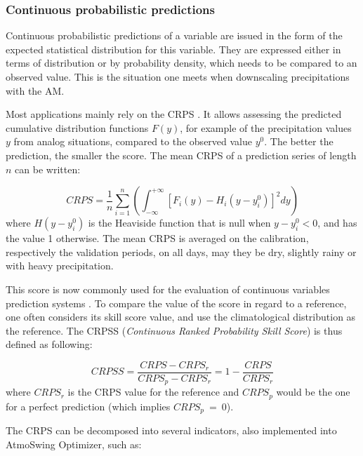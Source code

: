 \documentclass[review]{elsarticle}
\begin{document}
\subsubsection{Continuous probabilistic predictions}
\label{sec:prob_forecasts}

Continuous probabilistic predictions of a variable are issued in the form of the expected statistical distribution for this variable. They are expressed either in terms of distribution or by probability density, which needs to be compared to an observed value. This is the situation one meets when downscaling precipitations with the AM.

Most applications mainly rely on the CRPS \citep[Continuous Ranked Probability Score,][]{Brown1974, Matheson1976, Hersbach2000}. It allows assessing the predicted cumulative distribution functions $F(y)$, for example of the precipitation values $y$ from analog situations, compared to the observed value $y^{0}$. The better the prediction, the smaller the score. The mean CRPS of a prediction series of length $n$ can be written:

\begin{equation}
\label{eq:CRPS}
CRPS = \frac{1}{n} \sum_{i=1}^{n} \left(  \int_{-\infty}^{+\infty} \left[ F_{i}(y)-H_{i}(y-y_{i}^{0})\right]^{2} dy \right) 
\end{equation}
where $H(y-y_{i}^{0})$ is the Heaviside function that is null when $y-y_{i}^{0}<0$, and has the value 1 otherwise. The mean CRPS is averaged on the calibration, respectively the validation periods, on all days, may they be dry, slightly rainy or with heavy precipitation.

This score is now commonly used for the evaluation of continuous variables prediction systems \citep{Casati2008, Marty2010}. To compare the value of the score in regard to a reference, one often considers its skill score value, and use the climatological distribution as the reference. The CRPSS (\textit{Continuous Ranked Probability Skill Score}) is thus defined as following:

\begin{equation}
\label{eq:CRPSS}
CRPSS = \frac{CRPS-CRPS_{r}}{CRPS_{p}-CRPS_{r}} = 1-\frac{CRPS}{CRPS_{r}}
\end{equation}
where $CRPS_{r}$ is the CRPS value for the reference and $CRPS_{p}$ would be the one for a perfect prediction (which implies $CRPS_{p}~=~0$).

The CRPS can be decomposed into several indicators, also implemented into AtmoSwing Optimizer, such as:
\end{document}
